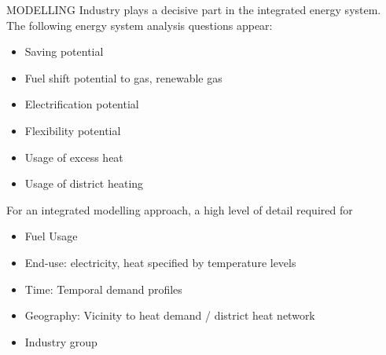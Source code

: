 \documentclass[review]{elsarticle}
\begin{document}
MODELLING
Industry plays a decisive part in the integrated energy system. The following energy system analysis questions appear:
\begin{itemize}
    \item Saving potential
    \item Fuel shift potential to gas, renewable gas
    \item Electrification potential
    \item Flexibility potential
    \item Usage of excess heat
    \item Usage of district heating
\end{itemize}
For an integrated modelling approach, a high level of detail required for
\begin{itemize}
    \item Fuel Usage
    \item End-use: electricity, heat specified by temperature levels
    \item Time: Temporal demand profiles
    \item Geography: Vicinity to heat demand / district heat network
    \item Industry group
\end{itemize} 
\end{document}
